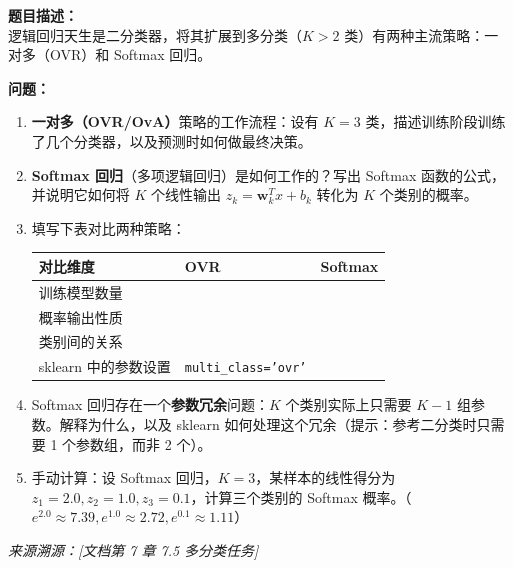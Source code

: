 \documentclass[a4paper,11pt]{ctexart}
\begin{document}
\begin{problembox}
    \textbf{题目描述：}\\
    逻辑回归天生是二分类器，将其扩展到多分类（$K>2$ 类）有两种主流策略：一对多（OVR）和 Softmax 回归。

    \vspace{0.2cm}
    \textbf{问题：}
    \begin{enumerate}[(1)]
        \item \textbf{一对多（OVR/OvA）}策略的工作流程：设有 $K=3$ 类，描述训练阶段训练了几个分类器，以及预测时如何做最终决策。

        \item \textbf{Softmax 回归}（多项逻辑回归）是如何工作的？写出 Softmax 函数的公式，并说明它如何将 $K$ 个线性输出 $z_k = \boldsymbol{w}_k^T x + b_k$ 转化为 $K$ 个类别的概率。

        \item 填写下表对比两种策略：
        \begin{center}
        \begin{tabular}{p{3cm} p{4cm} p{4.5cm}}
            \toprule
            对比维度 & OVR & Softmax \\
            \midrule
            训练模型数量 & \underline{\hspace{3.5cm}} & \underline{\hspace{4cm}} \\[1.2em]
            概率输出性质 & \underline{\hspace{3.5cm}} & \underline{\hspace{4cm}} \\[1.2em]
            类别间的关系 & \underline{\hspace{3.5cm}} & \underline{\hspace{4cm}} \\[1.2em]
            sklearn 中的参数设置 & \texttt{multi\_class='ovr'} & \underline{\hspace{4cm}} \\
            \bottomrule
        \end{tabular}
        \end{center}

        \item Softmax 回归存在一个\textbf{参数冗余}问题：$K$ 个类别实际上只需要 $K-1$ 组参数。解释为什么，以及 sklearn 如何处理这个冗余（提示：参考二分类时只需要 1 个参数组，而非 2 个）。

        \item 手动计算：设 Softmax 回归，$K=3$，某样本的线性得分为 $z_1=2.0, z_2=1.0, z_3=0.1$，计算三个类别的 Softmax 概率。（$e^{2.0}\approx7.39, e^{1.0}\approx2.72, e^{0.1}\approx1.11$）
    \end{enumerate}
    {\color{gray}\small\textit{来源溯源：[文档第 7 章 7.5 多分类任务]}}
\end{problembox}
\end{document}
